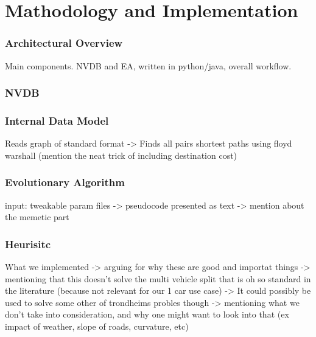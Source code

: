 \chapter{Mathodology and Implementation}

\subsection{Architectural Overview}
Main components. NVDB and EA, written in python/java, overall workflow.

\subsection{NVDB}

\subsection{Internal Data Model}
Reads graph of standard format -> Finds all pairs shortest paths using floyd warshall (mention the neat trick of including destination cost)

\subsection{Evolutionary Algorithm}
input: tweakable param files -> pseudocode presented as text -> mention about the memetic part

\subsection{Heurisitc}
What we implemented 
-> arguing for why these are good and importat things 
-> mentioning that this doesn't solve the multi vehicle split that is oh so standard in the literature (because not relevant for our 1 car use case) 
	-> It could possibly be used to solve some other of trondheims probles though 
-> mentioning what we don't take into consideration, and why one might want to look into that (ex impact of weather, slope of roads, curvature, etc)

\cleardoublepage